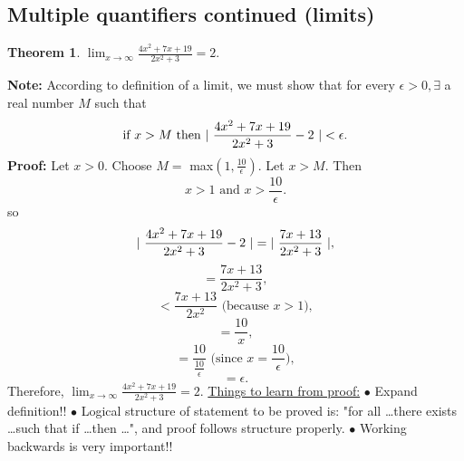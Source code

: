 \documentclass{article}
\newtheorem{theorem}{Theorem}                                       %
\begin{document}
\subsection{Multiple quantifiers continued (limits)}
\begin{theorem}
  $\lim_{x \to \infty} \frac{4x^2 + 7x + 19}{2x^2 + 3} = 2.$
\end{theorem}
\textbf{Note: } According to definition of a limit, we must show that for every $\epsilon > 0, \exists$ a real number $M$ such that
$$\text{if } x > M \text{ then } \arrowvert \text{ } \frac{4x^2 + 7x + 19}{2x^2 + 3} - 2 \text{ } \arrowvert < \epsilon.$$
\textbf{Proof: } Let $x > 0.$
\newline
Choose $M = $ max$(1, \frac{10}{\epsilon}).$
\newline
Let $x > M. $ Then
$$x > 1 \text{ and } x > \frac{10}{\epsilon}.$$
so
\newline
$$\arrowvert \text{ } \frac{4x^2 + 7x + 19}{2x^2 + 3} - 2 \text{ } \arrowvert = \arrowvert \text{ } \frac{7x + 13}{2x^2 + 3} \text{ } \arrowvert,$$
$$ = \frac{7x + 13}{2x^2 + 3},$$
$$ < \frac{7x + 13}{2x^2} \text{ (because $x > 1$)},$$
$$ = \frac{10}{x},$$
$$ = \frac{10}{\frac{10}{\epsilon}} \text{ (since $x = \frac{10}{\epsilon}$)},$$
$$ = \epsilon.$$
Therefore, $\lim_{x \to \infty} \frac{4x^2 + 7x + 19}{2x^2 + 3} = 2.$
\newline
\newline
\underline{Things to learn from proof:}
\newline
$\bullet $ Expand definition!!
\newline
$\bullet $ Logical structure of statement to be proved is: "for all \dots there exists \dots such that if \dots then \dots",
and proof follows structure properly. 
\newline
$\bullet $ Working backwards is very important!!
\newpage
\end{document}
